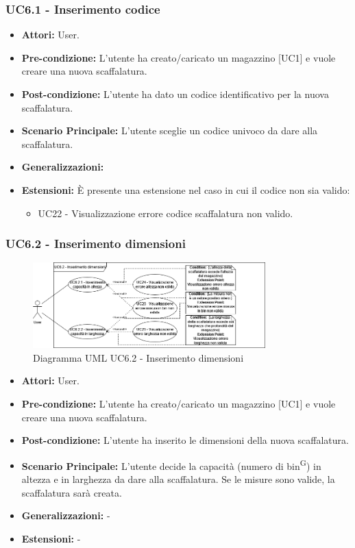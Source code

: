 \subsubsection{UC6.1 - Inserimento codice}
\begin{itemize}
    \item \textbf{Attori:} User.
    \item \textbf{Pre-condizione:}  L'utente ha creato/caricato un magazzino [UC1] e vuole creare una nuova scaffalatura.
    \item \textbf{Post-condizione:} L'utente ha dato un codice identificativo per la nuova scaffalatura.
    \item \textbf{Scenario Principale:}  L'utente sceglie un codice univoco da dare alla scaffalatura.
    \item \textbf{Generalizzazioni:} 
    \item \textbf{Estensioni:} È presente una estensione nel caso in cui il codice non sia valido:
    \begin{itemize}
        \item UC22 - Visualizzazione errore codice scaffalatura non valido.
    \end{itemize}
\end{itemize}


\subsubsection{UC6.2 - Inserimento dimensioni}
\begin{figure}[H]
  \centering
  \includegraphics[width=0.8\textwidth]{UC_diagrams_1-10/UC6.2.drawio.png}
   \caption{Diagramma UML UC6.2 - Inserimento dimensioni}
\end{figure}
\begin{itemize}
    \item \textbf{Attori:} User.
    \item \textbf{Pre-condizione:} L'utente ha creato/caricato un magazzino [UC1] e vuole creare una nuova scaffalatura.
    \item \textbf{Post-condizione:}  L'utente ha inserito le dimensioni della nuova scaffalatura.
    \item \textbf{Scenario Principale:}  L'utente decide la capacità (numero di bin\textsuperscript{G}) in altezza e in larghezza da dare alla scaffalatura. Se le misure sono valide, la scaffalatura sarà creata.
    \item \textbf{Generalizzazioni:} -
    \item \textbf{Estensioni:} -
\end{itemize}


